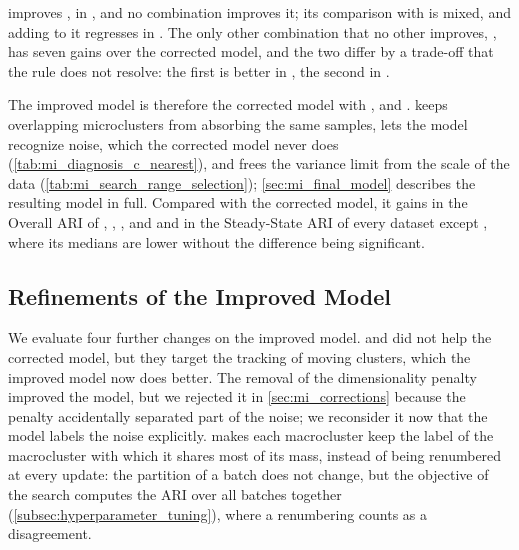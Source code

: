 

 improves , in \BenchmarkOne, and no combination improves it; its comparison with  is mixed, and adding  to it regresses in \ChameleonDSThree. The only other combination that no other improves, , has seven gains over the corrected model, and the two differ by a trade-off that the rule does not resolve: the first is better in \BenchmarkOne, the second in \ChameleonDSFour.

The improved model is therefore the corrected model with ,  and .  keeps overlapping microclusters from absorbing the same samples,  lets the model recognize noise, which the corrected model never does (\cref{tab:mi_diagnosis_c_nearest}), and  frees the variance limit from the scale of the data (\cref{tab:mi_search_range_selection}); \cref{sec:mi_final_model} describes the resulting model in full. Compared with the corrected model, it gains in the Overall ARI of \BenchmarkOne, \BenchmarkTwo, \ChameleonDSThree,  and  and in the Steady-State ARI of every dataset except \Cassini, where its medians are lower without the difference being significant.

\subsection{Refinements of the Improved Model}
\label{subsec:mi_refinements}

We evaluate four further changes on the improved model.  and  did not help the corrected model, but they target the tracking of moving clusters, which the improved model now does better. The removal of the dimensionality penalty improved the  model, but we rejected it in \cref{sec:mi_corrections} because the penalty accidentally separated part of the noise; we reconsider it now that the model labels the noise explicitly.  makes each macrocluster keep the label of the macrocluster with which it shares most of its mass, instead of being renumbered at every update: the partition of a batch does not change, but the objective of the search computes the ARI over all batches together (\cref{subsec:hyperparameter_tuning}), where a renumbering counts as a disagreement.

